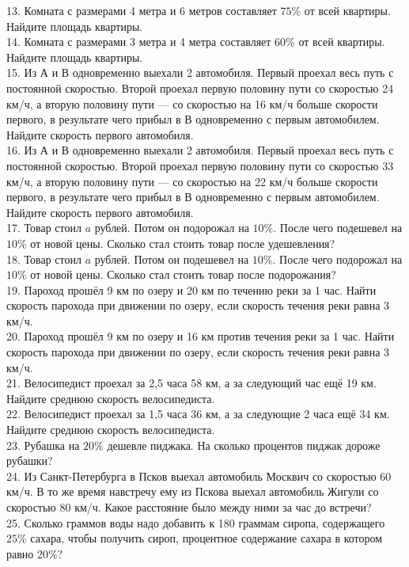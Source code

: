 13. Комната с размерами 4 метра и 6 метров составляет $75\%$ от всей квартиры. Найдите площадь квартиры.\\
14. Комната с размерами 3 метра и 4 метра составляет $60\%$ от всей квартиры. Найдите площадь квартиры.\\
15. Из А и В одновременно выехали 2 автомобиля. Первый проехал весь путь с постоянной скоростью. Второй проехал первую половину пути со скоростью 24 км/ч, а вторую половину пути --- со скоростью на 16 км/ч больше скорости первого, в результате чего прибыл в В одновременно с первым автомобилем. Найдите скорость первого автомобиля.\\
16. Из А и В одновременно выехали 2 автомобиля. Первый проехал весь путь с постоянной скоростью. Второй проехал первую половину пути со скоростью 33 км/ч, а вторую половину пути --- со скоростью на 22 км/ч больше скорости первого, в результате чего прибыл в В одновременно с первым автомобилем. Найдите скорость первого автомобиля.\\
17. Товар стоил $a$ рублей. Потом он подорожал на $10\%.$ После чего подешевел на $10\%$ от новой цены. Сколько стал стоить товар после удешевления?\\
18. Товар стоил $a$ рублей. Потом он подешевел на $10\%.$ После чего подорожал на $10\%$ от новой цены. Сколько стал стоить товар после подорожания?\\
19. Пароход прошёл 9 км по озеру и 20 км по течению реки за 1 час. Найти скорость парохода при движении по озеру, если скорость течения реки равна 3 км/ч.\\
20. Пароход прошёл 9 км по озеру и 16 км против течения реки за 1 час. Найти скорость парохода при движении по озеру, если скорость течения реки равна 3 км/ч.\\
21. Велосипедист проехал за 2,5 часа 58 км, а за следующий час ещё 19 км. Найдите среднюю скорость велосипедиста.\\
22. Велосипедист проехал за 1,5 часа 36 км, а за следующие 2 часа ещё 34 км. Найдите среднюю скорость велосипедиста.\\
23. Рубашка на $20\%$ дешевле пиджака. На сколько процентов пиджак дороже рубашки?\\
24. Из Санкт-Петербурга в Псков выехал автомобиль Москвич со скоростью 60 км/ч. В то же время навстречу ему из Пскова выехал автомобиль Жигули со скоростью 80 км/ч. Какое расстояние было между ними за час до встречи?\\
25. Сколько граммов воды надо добавить к 180 граммам сиропа, содержащего $25\%$ сахара, чтобы получить сироп, процентное содержание сахара в котором равно $20\%?$\\
